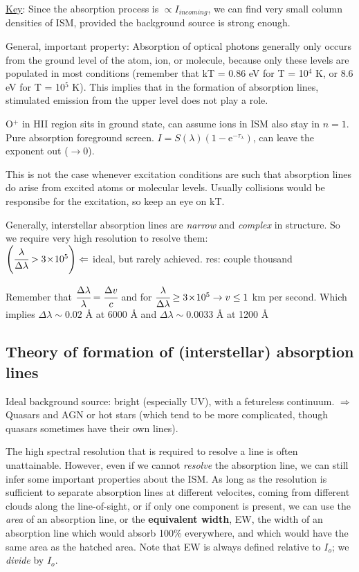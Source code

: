 \documentclass[12pt]{article}
\newcommand{\mar}[1]{\hspace{0pt}\marginpar{-\textcolor{black}{#1}-}}
\newcommand{\mynotes}[1]{\textcolor{mygreen}{#1}}
\begin{document}
\underline{Key}: Since the absorption process is $\propto I_{incoming}$,
we can find very small column densities of ISM, provided the
background source is strong enough.

General, important property: Absorption of optical photons generally
only occurs from the ground level of the atom, ion, or molecule,
because only these levels are populated in most conditions
(remember that kT = 0.86 eV for T = 10$^{4}$ K, or 8.6 eV for T = 10$^{5}$ K).
This implies that in the formation of absorption lines, stimulated emission
from the upper level does not play a role.

\mynotes{O$^{+}$ in HII region sits in ground state, can assume ions
in ISM also stay in $n=1$. Pure absorption foreground screen.
$I = S(\lambda)\left(1-\mathrm{e}^{-\tau_{\lambda}}\right)$, can
leave the exponent out ($\rightarrow 0$).}

This is not the case whenever excitation conditions are such that
absorption lines do arise from excited atoms or molecular levels.
Usually collisions would be responsibe for the excitation, so keep
an eye on kT.

\mar{90}Generally, interstellar absorption lines are \emph{narrow} and
\emph{complex} in structure. So we require very high resolution to
resolve them:\\
$\left(\cfrac{\lambda}{\Delta\lambda} > 3\!\times\!10^{5}\right) \Leftarrow$
ideal, but rarely achieved. \mynotes{res: couple thousand}

\begin{tcolorbox}[colback=darkpowderblue!5!white,colframe=darkpowderblue!75!black,title=Aside]
Remember that $\cfrac{\Delta\lambda}{\lambda} = \cfrac{\Delta{v}}{c}$
and for $\cfrac{\lambda}{\Delta\lambda} \ge 3\!\times\!10^{5}
\rightarrow v \le 1$ km per second. Which implies
$\Delta\lambda \sim 0.02$ \AA{} at 6000 \AA{} and
$\Delta\lambda \sim 0.0033$ \AA{} at 1200 \AA{}
\end{tcolorbox}

\subsection{Theory of formation of (interstellar) absorption lines}
\mynotes{Ideal background source: bright (especially UV), with a
fetureless continuum. $\Rightarrow$ Quasars and AGN or hot stars
(which tend to be more complicated, though quasars sometimes have
their own lines).}

The high spectral resolution that is required to resolve a line is
often unattainable. However, even if we cannot \emph{resolve} the
absorption line, we can still infer some important properties about
the ISM. As long as the resolution is sufficient to separate absorption lines
at different velocites, coming from different clouds along the
line-of-sight, or if only one component is present, we can use the
\emph{area} of an absorption line, or the \textbf{equivalent width}, EW,
the width of an absorption line which would absorb 100\% everywhere, and
which would have the same area as the hatched area. Note that EW
is always defined relative to $I_{o}$; we \emph{divide} by $I_{o}$.
\end{document}
